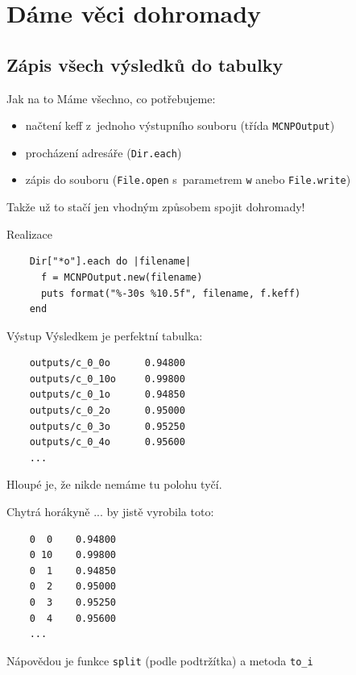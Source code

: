 \documentclass{beamer}
\begin{document}
\section{Dáme věci dohromady}

\subsection{Zápis všech výsledků do tabulky}

\begin{frame}{Jak na to}
  Máme všechno, co potřebujeme:
  \begin{itemize}
    \item načtení keff z~jednoho výstupního souboru (třída \texttt{MCNPOutput})
    \item procházení adresáře (\texttt{Dir.each})
    \item zápis do souboru (\texttt{File.open} s~parametrem \texttt{w} anebo \texttt{File.write})
  \end{itemize}
  Takže už to stačí jen vhodným způsobem spojit dohromady!
\end{frame}

\begin{frame}[fragile]{Realizace}
  \scriptsize
  \begin{verbatim}
    Dir["*o"].each do |filename|
      f = MCNPOutput.new(filename)
      puts format("%-30s %10.5f", filename, f.keff)
    end
  \end{verbatim}
\end{frame}

\begin{frame}[fragile]{Výstup}
  Výsledkem je perfektní tabulka:
  {\scriptsize
  \begin{verbatim}
    outputs/c_0_0o      0.94800
    outputs/c_0_10o     0.99800
    outputs/c_0_1o      0.94850
    outputs/c_0_2o      0.95000
    outputs/c_0_3o      0.95250
    outputs/c_0_4o      0.95600
    ...
  \end{verbatim}}
  Hloupé je, že nikde nemáme tu polohu tyčí.
\end{frame}


\begin{frame}[fragile]{Chytrá horákyně}
  ... by jistě vyrobila toto:
  {\scriptsize
  \begin{verbatim}
    0  0    0.94800
    0 10    0.99800
    0  1    0.94850
    0  2    0.95000
    0  3    0.95250
    0  4    0.95600
    ...
  \end{verbatim}
  }
  Nápovědou je funkce \texttt{split} (podle podtržítka) a metoda \texttt{to\_i}
\end{frame}
\end{document}
